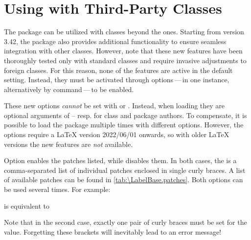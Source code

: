 \section{Using  with Third-Party Classes}

The  package can be utilized with classes beyond the
\KOMAScript{} ones. Starting from version
3.42, the package also provides
additional functionality to ensure seamless integration with other
classes. However, note that these new features have been thoroughly tested
only with standard classes and require invasive adjustments to foreign
classes. For this reason, none of the features are active in the default
setting. Instead, they must be activated through options\,---\,in one
instance, alternatively by command\,---\,to be enabled.

These new options \emph{cannot} be set with 
or . Instead, when loading 
they are optional arguments of  --
resp.  for class and package authors. To compensate, it
is possible to load the package multiple times with different
options. However, the options require a \LaTeX{} version
2022/06/01 onwards, so with older \LaTeX{}
versions the new features are \emph{not} available.

\begin{Declaration}
\end{Declaration}
Option enables the patches listed, while
 disables them.  In both cases, the  is a comma-separated list of individual patches enclosed in single
curly braces. A list of available patches can be found in
\autoref{tab:\LabelBase.patches}. Both options can be used several times. For
example:
\begin{lstcode}
  \usepackage[enablepatch=chapter,enablepatch=listoffigures]{tocbasic}
\end{lstcode}
is equivalent to
\begin{lstcode}
  \usepackage[enablepatch={chapter,listoffigure}]{tocbasic}
\end{lstcode}
Note that in the second case, exactly one pair of curly braces must be set for
the value. Forgetting these brackets will inevitably lead to an error message!

